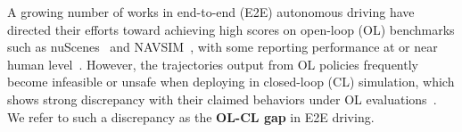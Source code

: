 \documentclass{article}
\begin{document}

A growing number of works in end-to-end (E2E) autonomous driving have directed their efforts toward achieving high scores on open-loop (OL) benchmarks such as nuScenes~\cite{caesar2020nuscenes} and NAVSIM~\cite{navsimv2, navsimv1}, with some reporting performance at or near human level~\cite{RAP, DrivoR}. However, the trajectories output from OL policies frequently become infeasible or unsafe when deploying in closed-loop (CL) simulation, which shows strong discrepancy with their claimed behaviors under OL evaluations~\cite{jia2024bench, li2024ego, ol_cl_survey,zhao2025quantv2x}. We refer to such a discrepancy as the \textbf{OL-CL gap} in E2E driving.
\end{document}
